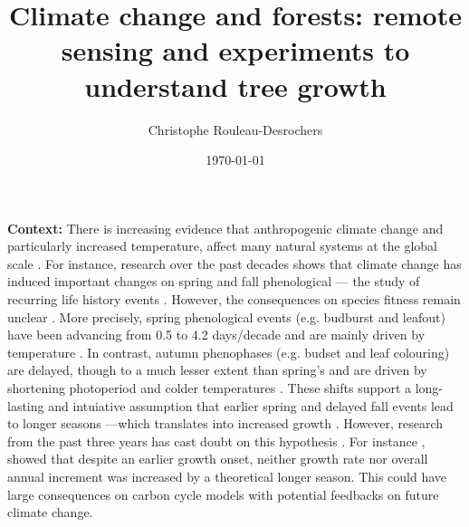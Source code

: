 \documentclass[12pt]{article}
\title{Climate change and forests: remote sensing and experiments to understand tree growth}
\date{\today}
\author{Christophe Rouleau-Desrochers}
\begin{document}

\maketitle


\textbf {Context:} There is increasing evidence that anthropogenic climate change and particularly increased temperature, affect many natural systems at the global scale \citep{intergovernmental_panel_on_climate_change_detection_2014,parmesan_poleward_1999,rosenzweig_attributing_2008}. For instance, research over the past decades shows that climate change has induced important changes on spring and fall phenological --- the study of recurring life history events \citep{parmesan_globally_2003,parmesan_poleward_1999}. However, the consequences on species fitness remain unclear \citep{duputie_phenological_2015}. More precisely, spring phenological events (e.g. budburst and leafout) have been advancing from 0.5 \citep{wolfe_climate_2005} to 4.2 days/decade \citep{chmielewski_response_2001,fu_recent_2014} and are mainly driven by temperature \citep{chuine_why_2010,cleland_shifting_2007,penuelas_responses_2001}. In contrast, autumn phenophases (e.g. budset and leaf colouring) are delayed, though to a much lesser extent than spring's \citep{gallinat_autumn_2015,jeong_macroscale_2014} and are driven by shortening photoperiod \citep{cooke_dynamic_2012,flynn_temperature_2018,korner_phenology_2010} and colder temperatures \citep{cooke_dynamic_2012,delpierre_temperate_2016}. These shifts support a long-lasting and intuiative assumption that earlier spring and delayed fall events lead to longer seasons ---which translates into increased growth \citep{keenan_net_2014}. However, research from the past three years has cast doubt on this hypothesis \citep{dow_warm_2022,green_limits_2022,silvestro_longer_2023}. For instance \citep{dow_warm_2022}, showed that despite an earlier growth onset, neither growth rate nor overall annual increment was increased by a theoretical longer season. This could have large consequences on carbon cycle models with potential feedbacks on future climate change.
\end{document}

